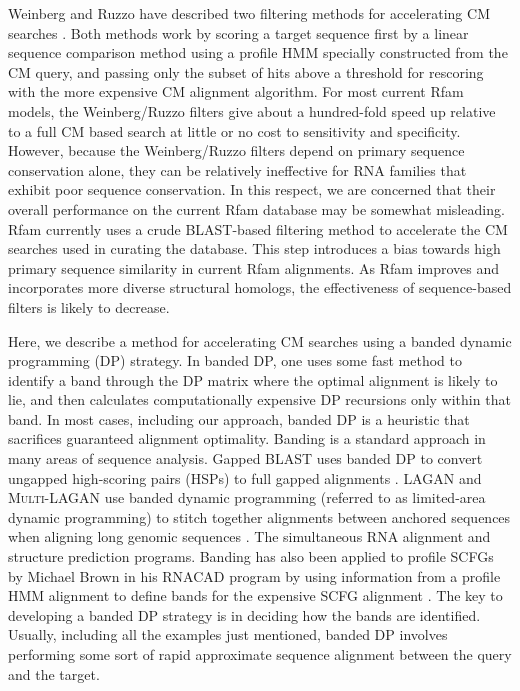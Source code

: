 \documentclass[11pt]{article}
\begin{document}
Weinberg and Ruzzo have described two filtering methods for
accelerating CM searches
\cite{Weinberg04,Weinberg04b,Weinberg05}. Both methods work by scoring
a target sequence first by a linear sequence comparison method using a
profile HMM specially constructed from the CM query, and passing only
the subset of hits above a threshold for rescoring with the more
expensive CM alignment algorithm.  For most current Rfam models, the
Weinberg/Ruzzo filters give about a hundred-fold speed up relative to
a full CM based search at little or no cost to sensitivity and
specificity. However, because the Weinberg/Ruzzo filters depend on
primary sequence conservation alone, they can be relatively
ineffective for RNA families that exhibit poor sequence
conservation. In this respect, we are concerned that their overall
performance on the current Rfam database may be somewhat
misleading. Rfam currently uses a crude BLAST-based filtering method
to accelerate the CM searches used in curating the database. This step
introduces a bias towards high primary sequence similarity in current
Rfam alignments. As Rfam improves and incorporates more diverse
structural homologs, the effectiveness of sequence-based filters is
likely to decrease.

Here, we describe a method for accelerating CM searches using a banded
dynamic programming (DP) strategy. In banded DP, one uses some fast
method to identify a band through the DP matrix where the optimal
alignment is likely to lie, and then calculates computationally
expensive DP recursions only within that band. In most cases,
including our approach, banded DP is a heuristic that sacrifices
guaranteed alignment optimality. Banding is a standard approach in
many areas of sequence analysis. Gapped \textsc{BLAST} uses banded DP
to convert ungapped high-scoring pairs (HSPs) to full gapped
alignments \cite{Altschul97}.  \textsc{LAGAN} and \textsc{Multi-LAGAN}
use banded dynamic programming (referred to as limited-area dynamic
programming) to stitch together alignments between anchored sequences
when aligning long genomic sequences \cite{Brudno03}. The simultaneous
RNA alignment and structure prediction programs. Banding has also been
applied to profile SCFGs by Michael Brown in his \textsc{RNACAD}
program by using information from a profile HMM alignment to define
bands for the expensive SCFG alignment \cite{Brown00}. The key to
developing a banded DP strategy is in deciding how the bands are
identified.  Usually, including all the examples just mentioned,
banded DP involves performing some sort of rapid approximate sequence
alignment between the query and the target.
\end{document}
